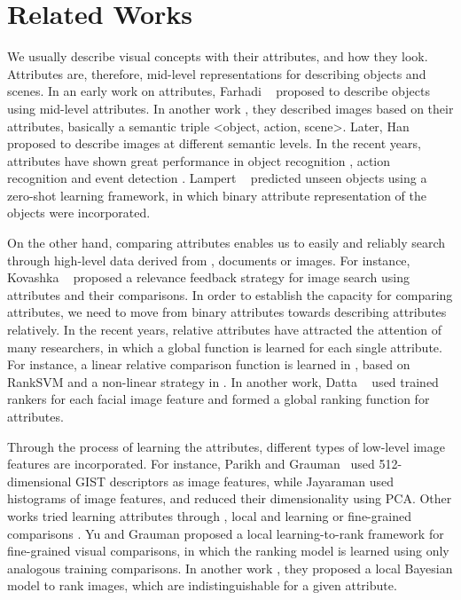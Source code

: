 

\section{Related Works}
\label{sec.2}

We usually describe visual concepts with their attributes, and how they look. Attributes are, therefore, mid-level representations for describing objects and scenes. In an early work on attributes, Farhadi \etal~\cite{Farhadi09describingobjects} proposed to describe objects using mid-level attributes. In another work \cite{farhadi10}, they described images based on their attributes, basically a semantic triple <object, action, scene>. Later, Han \etal~\cite{6739133} proposed to describe images at different semantic levels. In the recent years, attributes have shown great performance in object recognition \cite{Farhadi09describingobjects,7298613}, action recognition \cite{6838985,5995353} and event detection \cite{6475038}. Lampert \etal~\cite{6571196} predicted unseen objects using a zero-shot learning framework, in which binary attribute representation of the objects were incorporated. 

On the other hand, comparing attributes enables us to easily and reliably search through high-level data derived from \eg, documents or images. For instance, Kovashka \etal~\cite{KovashkaG13} proposed a relevance feedback strategy for image search using attributes and their comparisons. In order to establish the capacity for comparing attributes, we need to move from binary attributes towards describing attributes relatively. In the recent years, relative attributes have attracted the attention of many researchers, in which a global function is learned for each single attribute. For instance, a linear relative comparison function is learned in \cite{parikh2011}, based on RankSVM \cite{Joachims2002} and a non-linear strategy in \cite{Li2013}. In another work, Datta \etal~\cite{5771429} used trained rankers for each facial image feature and formed a global ranking function for attributes.

Through the process of learning the attributes, different types of low-level image features are incorporated. For instance, Parikh and Grauman~\cite{parikh2011} used 512-dimensional GIST \cite{Aude01} descriptors as image features, while Jayaraman \etal\cite{6909607} used histograms of image features, and reduced their dimensionality using PCA. Other works tried learning attributes through \eg, local and learning \cite{1641014} or fine-grained comparisons \cite{Yu2014}. Yu and Grauman \cite{Yu2014} proposed a local learning-to-rank framework for fine-grained visual comparisons, in which the ranking model is learned using only analogous training comparisons. In another work \cite{Yu2015}, they proposed a local Bayesian model to rank images, which are indistinguishable for a given attribute. 

